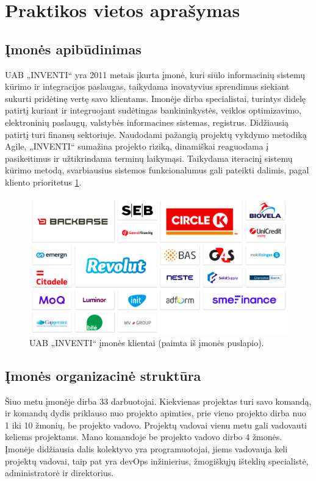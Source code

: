\section{Praktikos vietos aprašymas}

\subsection{Įmonės apibūdinimas}
UAB „INVENTI“ yra 2011 metais įkurta įmonė, kuri siūlo informacinių sistemų kūrimo ir integracijos paslaugas,
taikydama inovatyvius sprendimus siekiant sukurti pridėtinę vertę savo klientams.
Imonėje dirba specialistai, turintys didelę patirtį kuriant ir integruojant sudėtingas bankininkystės, veiklos optimizavimo, elektroninių paslaugų,
valstybės informacines sistemas, registrus. Didžiausią patirtį turi finansų sektoriuje.
Naudodami pažangią projektų vykdymo metodiką Agile, „INVENTI“ sumažina projekto riziką, dinamiškai reaguodama į pasikeitimus ir užtikrindama terminų laikymąsi.
Taikydama iteracinį sistemų kūrimo metodą, svarbiausius sistemos funkcionalumus gali pateikti dalimis, pagal kliento prioritetus \ref{img:clients}.

\begin{figure}[H]
    \centering
    \includegraphics[scale=0.4]{img/clients.png}
    \caption{UAB „INVENTI“ įmonės klientai (paimta iš įmonės puslapio).}
    \label{img:clients}
\end{figure}


\subsection{Įmonės organizacinė struktūra}
Šiuo metu įmonėje dirba 33 darbuotojai. Kiekvienas projektas turi savo komandą,
ir komandų dydis priklauso nuo projekto apimties, prie vieno projekto dirba nuo 1 iki 10 žmonių, be projekto vadovo. Projektų vadovai vienu metu gali
vadovauti keliems projektams. Mano komandoje be projekto vadovo dirbo 4 žmonės. Įmonėje didžiausia dalis kolektyvo yra programuotojai, jiems vadovauja keli projektų vadovai,
taip pat yra devOps inžinierius, žmogiškųjų išteklių specialistė, administratorė ir direktorius.


